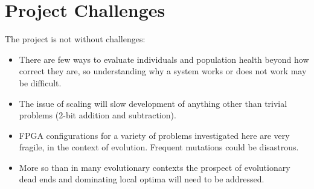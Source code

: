 \section{Project Challenges}
The project is not without challenges:
\begin{itemize}
	\item There are few ways to evaluate individuals and population health beyond how
		correct they are, so understanding why a system works or does not work may
		be difficult.
	\item The issue of scaling will slow development of anything other than
		trivial problems (2-bit addition and subtraction).
	\item FPGA configurations for a variety of problems investigated here are very fragile, in the
		context of evolution. Frequent mutations could be disastrous.
	\item More so than in many evolutionary contexts the prospect of evolutionary dead ends
		and dominating local optima will need to be addressed.
\end{itemize}
